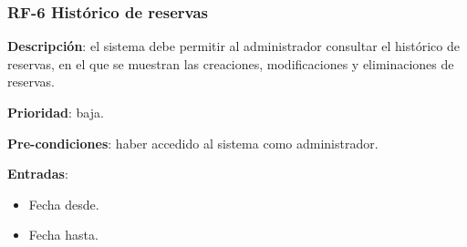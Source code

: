\subsubsection{RF-6 Histórico de reservas}

\textbf{Descripción}: el sistema debe permitir al administrador consultar el histórico de reservas, en el que se muestran las creaciones, modificaciones y eliminaciones de reservas.

\textbf{Prioridad}: baja.

\textbf{Pre-condiciones}: haber accedido al sistema como administrador.

\textbf{Entradas}:
    \begin{itemize}
    \tightlist
        \item Fecha desde.
        \item Fecha hasta.
    \end{itemize}

